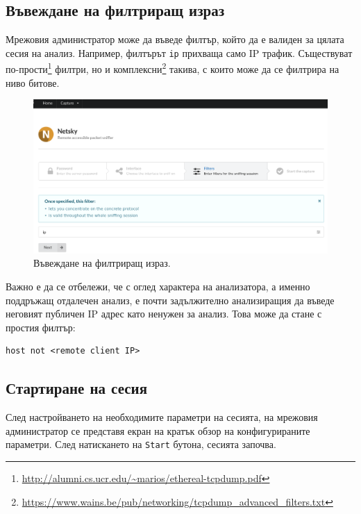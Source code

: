 \documentclass[12pt,a4paper,oneside]{book}
\begin{document}
\subsection{Въвеждане на филтриращ израз}

Мрежовия администратор може да въведе филтър, който да е валиден за цялата сесия
на анализ. Например, филтърът \texttt{ip} прихваща само IP трафик. Съществуват
по-прости\footnote{\url{http://alumni.cs.ucr.edu/~marios/ethereal-tcpdump.pdf}}
филтри,
но и
комплексни\footnote{\url{https://www.wains.be/pub/networking/tcpdump_advanced_filters.txt}}
такива, с които може да се филтрира на ниво битове.

\begin{figure}[h!]
  \centering
  \includegraphics[width=\textwidth]{figures/screenshots/filter.png}
  \caption{Въвеждане на филтриращ израз.}
  \label{screenshots_filter_fig}
\end{figure}

Важно е да се отбележи, че с
оглед характера на анализатора, а именно поддръжащ отдалечен анализ, е почти
задължително анализиращия да въведе неговият публичен IP адрес като ненужен за
анализ. Това може да стане с простия филтър:

\begin{lstlisting}[caption=Филтър изолиращ адреса на
  отдалечения клиент от прихващаните пакети]
  host not <remote client IP>
\end{lstlisting}

\subsection{Стартиране на сесия}

След настройването на необходимите параметри на сесията, на мрежовия
администратор се представя екран на кратък обзор на конфигурираните параметри.
След натискането на \texttt{Start} бутона, сесията започва.
\end{document}
